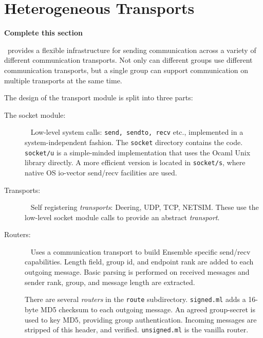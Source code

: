 %
%
%
\newcommand{\sourcefile}[1]    {{\tt {#1}}}


\section{Heterogeneous Transports}

{\bf  Complete this section}

\ensemble\ provides a flexible infrastructure for sending communication
across a variety of different communication transports.  Not only can
different groups use different communication transports, but a single group
can support communication on multiple transports at the same time.

The design of the transport module is split into three parts: 
\begin{description}
\item[The socket module:] ~\newline
   Low-level system calls: {\tt send, sendto, recv} etc.,
  implemented in a system-independent fashion. The {\tt socket}
  directory contains the code. {\tt socket/u} is a simple-minded
  implementation that uses the Ocaml Unix library directly. A more
  efficient version is located in {\tt socket/s}, where native OS
  io-vector send/recv facilities are used. 

\item[Transports:] ~\newline
  Self registering {\it transports}:  Deering, UDP, TCP, NETSIM. These
  use the low-level socket module calls to provide an abstract {\it transport}.
	
\item[Routers:] ~\newline
  Uses a communication transport to
  build Ensemble specific send/recv capabilities. Length field, 
  group id, and endpoint rank are added to each outgoing
  message. Basic parsing is performed on received messages and sender
  rank, group, and message length are extracted. 
 
  There are several {\it routers} in the {\tt route}
  subdirectory. \sourcefile{signed.ml} adds a 16-byte MD5 checksum to
  each outgoing message. An agreed group-secret is used to key MD5,
  providing group authentication. Incoming messages are stripped of
  this header, and verified. \sourcefile{unsigned.ml} is the vanilla router.

\end{description}


